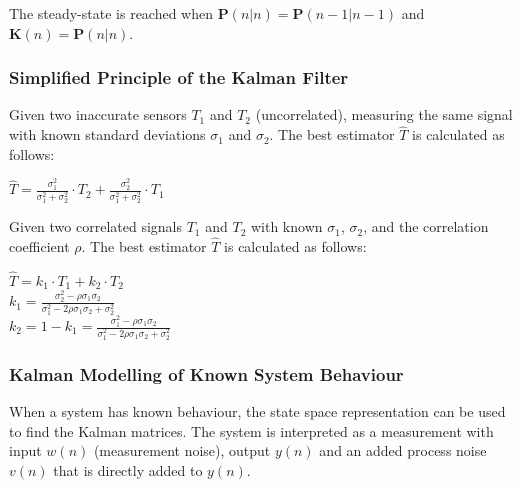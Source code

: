 The steady-state is reached when $\mathbf{P}(n|n) = \mathbf{P}(n-1 | n-1)$ and $\mathbf{K}(n) = \mathbf{P}(n|n)$.

\subsubsection{Simplified Principle of the Kalman Filter}
\begin{minipage}{14.5cm}
Given two inaccurate sensors $T_1$ and $T_2$ (uncorrelated), measuring the same signal with known standard deviations $\sigma_1$ and $\sigma_2$. The best
estimator $\hat{T}$ is calculated as follows:\\
\end{minipage}
\hspace{0.25cm}
\begin{minipage}{5cm}
$\hat{T}=\frac{\sigma_1^2}{\sigma_1^2+\sigma_2^2}\cdot T_2+\frac{\sigma_2^2}{\sigma_1^2+\sigma_2^2}\cdot T_1$
\end{minipage}
\begin{minipage}{14.5cm}
Given two correlated signals $T_1$ and $T_2$ with known $\sigma_1$, $\sigma_2$, and the correlation coefficient $\rho$. The best
estimator $\hat{T}$ is calculated as follows:\\
\end{minipage}
\hspace{0.25cm}
\begin{minipage}{5cm}
$\hat{T}=k_1\cdot T_1 + k_2\cdot T_2$\\
$k_1=\frac{\sigma_2^2-\rho \sigma_1 \sigma_2}{\sigma_1^2 - 2 \rho \sigma_1 \sigma_2 + \sigma_2^2}$\\
$k_2=1-k_1=\frac{\sigma_1^2-\rho \sigma_1 \sigma_2}{\sigma_1^2 - 2 \rho \sigma_1 \sigma_2 + \sigma_2^2}$\\
\end{minipage}


\subsubsection{Kalman Modelling of Known System Behaviour}
When a system has known behaviour, the state space representation can be used to find the Kalman matrices. The system is interpreted as a measurement with input $w(n)$ (measurement noise), output $y(n)$ and an added process noise $v(n)$ that is directly added to $y(n)$. 


